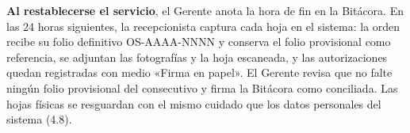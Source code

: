 \textbf{Al restablecerse el servicio}, el Gerente anota la hora de fin en
la Bitácora. En las 24 horas siguientes, la recepcionista captura cada hoja
en el sistema: la orden recibe su folio definitivo OS-AAAA-NNNN y conserva
el folio provisional como referencia, se adjuntan las fotografías y la hoja
escaneada, y las autorizaciones quedan registradas con medio «Firma en
papel». El Gerente revisa que no falte ningún folio provisional del
consecutivo y firma la Bitácora como conciliada. Las hojas físicas se
resguardan con el mismo cuidado que los datos personales del sistema (4.8).


